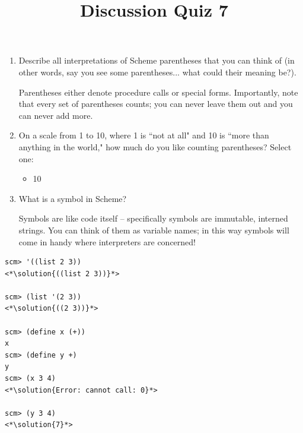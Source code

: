 \documentclass[twoside]{article}
\title{\sc Discussion Quiz 7 \solution{Solutions}}
\newcommand{\solution}[1]{{\color{red}#1}}
\newcommand\solution[1]{} %
\begin{document}
\thispagestyle{empty}
\maketitle

\begin{enumerate}

\begin{enumerate}
\item Describe all interpretations of Scheme parentheses that you can think of (in other words, say you see some parentheses... what could their meaning be?).

\solution{Parentheses either denote procedure calls or special forms. Importantly, note that every set of parentheses counts; you can never leave them out and you can never add more.}

\item On a scale from 1 to 10, where 1 is ``not at all" and 10 is ``more than anything in the world," how much do you like counting parentheses? Select one:

\begin{itemize}
\item \solution{10}
\end{itemize}

\vspace{0.02in}

\item What is a symbol in Scheme?

\solution{Symbols are like code itself -- specifically symbols are immutable, interned strings. You can think of them as variable names; in this way symbols will come in handy where interpreters are concerned!}

\end{enumerate}


\begin{lstlisting}
scm> '((list 2 3))
<*\solution{((list 2 3))}*>

scm> (list '(2 3))
<*\solution{((2 3))}*>

scm> (define x (+))
x
scm> (define y +)
y
scm> (x 3 4)
<*\solution{Error: cannot call: 0}*>

scm> (y 3 4)
<*\solution{7}*>
\end{lstlisting}



\end{enumerate}
\end{document}
